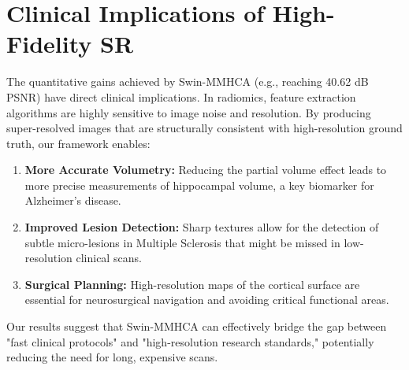 \section{Clinical Implications of High-Fidelity SR}
The quantitative gains achieved by Swin-MMHCA (e.g., reaching 40.62 dB PSNR) have direct clinical implications. In radiomics, feature extraction algorithms are highly sensitive to image noise and resolution. By producing super-resolved images that are structurally consistent with high-resolution ground truth, our framework enables:
\begin{enumerate}
    \item \textbf{More Accurate Volumetry:} Reducing the partial volume effect leads to more precise measurements of hippocampal volume, a key biomarker for Alzheimer's disease.
    \item \textbf{Improved Lesion Detection:} Sharp textures allow for the detection of subtle micro-lesions in Multiple Sclerosis that might be missed in low-resolution clinical scans.
    \item \textbf{Surgical Planning:} High-resolution maps of the cortical surface are essential for neurosurgical navigation and avoiding critical functional areas.
\end{enumerate}
Our results suggest that Swin-MMHCA can effectively bridge the gap between "fast clinical protocols" and "high-resolution research standards," potentially reducing the need for long, expensive scans.
